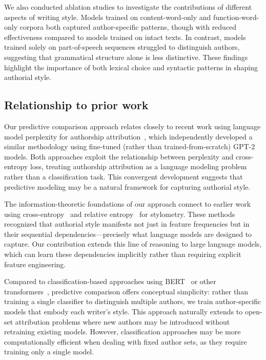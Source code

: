 \documentclass{llmxive}
\begin{document}
We also conducted ablation studies to investigate the contributions of different
aspects of writing style. Models trained on content-word-only and function-word-only
corpora both captured author-specific patterns, though with reduced effectiveness
compared to models trained on intact texts. In contrast, models trained solely on
part-of-speech sequences struggled to distinguish authors, suggesting that
grammatical structure alone is less distinctive. These findings highlight the
importance of both lexical choice and syntactic patterns in shaping authorial style.

\subsection{Relationship to prior work}

Our predictive comparison approach relates closely to recent work using
language model perplexity for authorship attribution~\citep{HuanEtal25}, which
independently developed a similar methodology using fine-tuned (rather than
trained-from-scratch) GPT-2 models. Both approaches exploit the relationship
between perplexity and cross-entropy loss, treating authorship attribution as a
language modeling problem rather than a classification task. This convergent
development suggests that predictive modeling may be a natural framework for
capturing authorial style.

The information-theoretic foundations of our approach connect to earlier work
using cross-entropy~\citep{JuolBaay05} and relative entropy~\citep{ZhaoEtal06}
for stylometry. These methods recognized that authorial style manifests not
just in feature frequencies but in their sequential dependencies---precisely
what language models are designed to capture. Our contribution extends this
line of reasoning to large language models, which can learn these dependencies
implicitly rather than requiring explicit feature engineering.

Compared to classification-based approaches using BERT~\citep{FabiEtal20} or
other transformers~\citep{UcheEtal20}, predictive comparison offers conceptual
simplicity: rather than training a single classifier to distinguish multiple
authors, we train author-specific models that embody each writer's style. This
approach naturally extends to open-set attribution problems where new authors
may be introduced without retraining existing models. However, classification
approaches may be more computationally efficient when dealing with fixed author
sets, as they require training only a single model.
\end{document}
